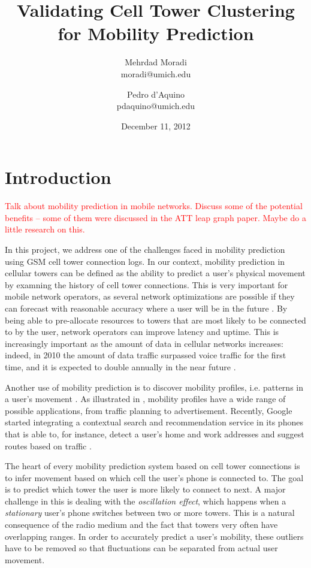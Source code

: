 \documentclass[a4paper,12pt]{article}
\newcommand{\xxx}[1]{\textcolor{red}{#1}}
\begin{document}
\title{Validating Cell Tower Clustering for Mobility Prediction}
\author{Mehrdad Moradi\\moradi@umich.edu \and Pedro d'Aquino\\pdaquino@umich.edu}
\date{December 11, 2012}

\maketitle

\section{Introduction}

\xxx{Talk about mobility prediction in mobile networks. Discuss some of the potential benefits -- some of them were discussed in the
ATT leap graph paper. Maybe do a little research on this.}

In this project, we address one of the challenges faced in mobility prediction using GSM cell tower connection logs. In our context, mobility prediction in cellular
towers can be defined as the ability to predict a user's physical movement by examning the history of cell tower connections. This is very important
for mobile network operators, as several network optimizations are possible if they can forecast with reasonable accuracy
where a user will be in the future \cite{LeapGraph} \cite{Liu97anoptimal}. By being able to pre-allocate resources to towers that are most likely to
be connected to by the user, network operators can improve latency and uptime. This is increasingly important as the amount of data in cellular networks
increases: indeed, in 2010 the amount of data traffic surpassed voice traffic for the first time, and it is expected to double annually in the near future
\cite{EricssonData}.

Another use of mobility prediction is to discover mobility profiles, i.e. patterns in a user's movement \cite{mobilityprofiler}. As illustrated in \cite{mobilityprofiler}, mobility profiles have a wide range of possible applications, from traffic planning to advertisement. Recently, Google started integrating
a contextual search and recommendation service in its phones that is able to, for instance, detect a user's home and work addresses and suggest routes based on
traffic \cite{googleNow}.


The heart of every mobility prediction system based on cell tower connections is to infer movement based on which cell the user's phone is connected to. The goal
is to predict which tower the user is more likely to connect to next. A major challenge in this is dealing with the \textit{oscillation effect}, which happens when a \textit{stationary} user's phone switches between two or more towers. This is a natural consequence of the radio medium and the fact that towers very often have overlapping ranges. In order to accurately predict a user's mobility, these outliers have to be removed so that fluctuations can be separated from actual user movement.
\end{document}
